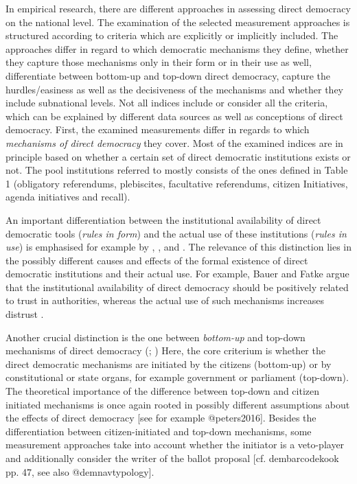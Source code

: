 \documentclass{systats}
\begin{document}
In empirical research, there are different approaches in assessing direct democracy on the national level. The examination of the selected measurement approaches is structured according to criteria which are explicitly or implicitly included. The approaches differ in regard to which democratic mechanisms they define, whether they capture those mechanisms only in their form or in their use as well, differentiate between bottom-up and top-down direct democracy, capture the hurdles/easiness as well as the decisiveness of the mechanisms and whether they include subnational levels. Not all indices include or consider all the criteria, which can be explained by different data sources as well as conceptions of direct democracy. First, the examined measurements differ in regards to which \textit{mechanisms of direct democracy} they cover. Most of the examined indices are in principle based on whether a certain set of direct democratic institutions exists or not. The pool institutions referred to mostly consists of the ones defined in Table 1 (obligatory referendums, plebiscites, facultative referendums, citizen Initiatives, agenda initiatives and recall).  

An important differentiation between the institutional availability of direct democratic tools (\textit{rules in form}) and the actual use of these institutions (\textit{rules in use}) is emphasised for example by \citealp[][]{bauerfatke2014}, \citealp[][]{gherghina2016}, \citealp[][]{blume2007} and \citealp[][]{peters2016}. The relevance of this distinction lies in the possibly different causes and effects of the formal existence of direct democratic institutions and their actual use. For example, Bauer and Fatke argue that the institutional availability of direct democracy should be positively related to trust in authorities, whereas the actual use of such mechanisms increases distrust \citealp[cf.][53f]{bauerfatke2014}. 

Another crucial distinction is the one between \textit{bottom-up} and {top-down} mechanisms of direct democracy (\citealp[cf.][]{peters2016}; \citealp[cf.][]{altman2017}) Here, the core criterium is whether the direct democratic mechanisms are initiated by the citizens (bottom-up) or by constitutional or state organs, for example government or parliament (top-down). The theoretical importance of the difference between top-down and citizen initiated mechanisms is once again rooted in possibly different assumptions about the effects of direct democracy [see for example @peters2016]. Besides the differentiation between citizen-initiated and top-down mechanisms, some measurement approaches take into account whether the initiator is a veto-player and additionally consider the writer of the ballot proposal [cf. dembarcodekook pp. 47, see also @demnavtypology].
\end{document}
